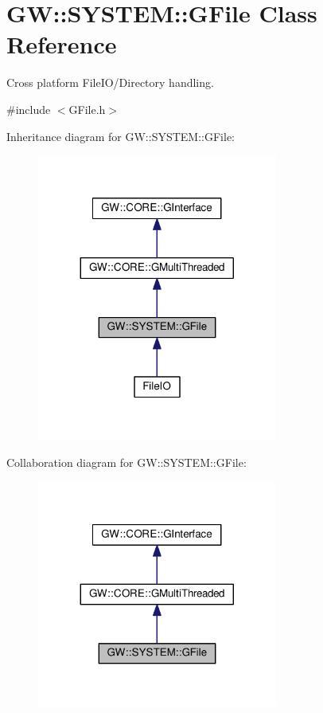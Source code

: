 \hypertarget{classGW_1_1SYSTEM_1_1GFile}{}\section{GW\+:\+:S\+Y\+S\+T\+EM\+:\+:G\+File Class Reference}
\label{classGW_1_1SYSTEM_1_1GFile}


Cross platform File\+I\+O/\+Directory handling.  




{\ttfamily \#include $<$G\+File.\+h$>$}



Inheritance diagram for GW\+:\+:S\+Y\+S\+T\+EM\+:\+:G\+File\+:
\nopagebreak
\begin{figure}[H]
\begin{center}
\leavevmode
\includegraphics[width=224pt]{classGW_1_1SYSTEM_1_1GFile__inherit__graph}
\end{center}
\end{figure}


Collaboration diagram for GW\+:\+:S\+Y\+S\+T\+EM\+:\+:G\+File\+:
\nopagebreak
\begin{figure}[H]
\begin{center}
\leavevmode
\includegraphics[width=224pt]{classGW_1_1SYSTEM_1_1GFile__coll__graph}
\end{center}
\end{figure}
